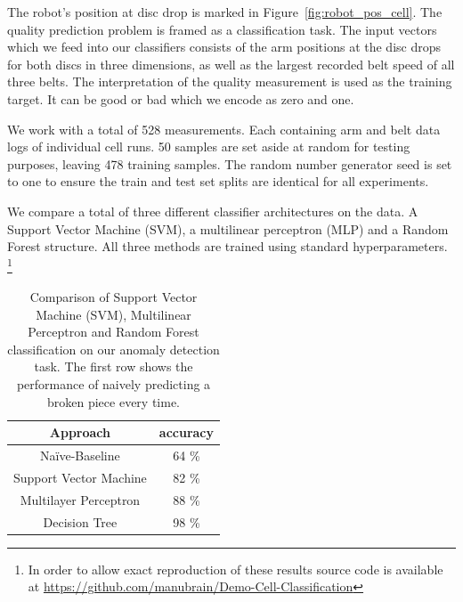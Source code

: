 \documentclass[5p,times,procedia]{elsarticle}
\begin{document}
The robot's position at disc drop is marked in 
Figure~\ref{fig:robot_pos_cell}. The quality prediction problem is 
framed as a classification task. The input vectors which we feed into our
classifiers consists of the arm positions at the disc drops for both
discs in three dimensions, as well as the largest recorded belt speed
of all three belts. The interpretation of the quality measurement is 
used as the training target. It can be good or bad which we encode as 
zero and one.

We work with a total of 528 measurements. Each containing arm and belt data
logs of individual cell runs. 50 samples are set aside at random for testing 
purposes, leaving 478 training samples. The random number generator seed is
set to one to ensure the train and test set splits are identical 
for all experiments.

We compare a total of three different classifier architectures on the data.
A Support Vector Machine (SVM), a multilinear perceptron (MLP) and a Random Forest
structure. All three methods are trained using standard hyperparameters.
\footnote{In order to allow exact reproduction of these results source
code is available at \url{https://github.com/manubrain/Demo-Cell-Classification}}

\begin{table}
       \centering
       \begin{tabular}{ c c } \toprule
              Approach         & accuracy \\ \midrule
              Na\"ive-Baseline & 64 \% \\
              Support Vector Machine & 82 \% \\
              Multilayer Perceptron & 88 \% \\
              Decision Tree         & 98 \% \\ \bottomrule
       \end{tabular}
       \caption{Comparison of Support Vector Machine (SVM), Multilinear Perceptron and 
                Random Forest classification on our anomaly detection task. 
                The first row shows the performance of naively predicting a broken piece
                every time.}
       \label{tab:class_comp}
\end{table}
\end{document}
